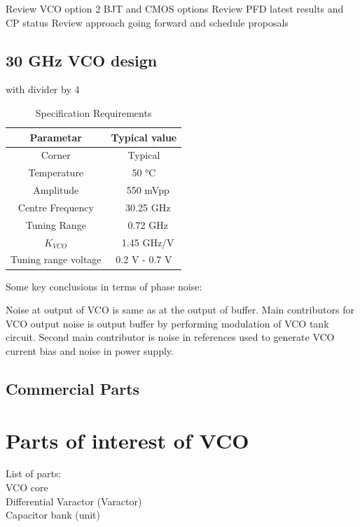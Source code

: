 \documentclass{article}
\begin{document}
Review VCO option 2 BJT and CMOS options
Review PFD latest results and CP status
Review approach going forward and schedule proposals


\subsection{30 GHz VCO design}

with divider by 4

\begin{table}[ht]
	\centering
	\begin{tabular}{|c|c|}
		\hline
		Parametar & Typical value \\
		\hline
		Corner & Typical \\
		\hline
		Temperature & 50 °C \\
		\hline
		Amplitude & ~ 550 mVpp \\
		\hline
		Centre Frequency & ~ 30.25 GHz \\
		\hline
		Tuning Range & ~ 0.72 GHz \\
		\hline
		$K_{VCO}$ & ~ 1.45 GHz/V \\
		\hline
		Tuning range voltage & 0.2 V - 0.7 V \\
		\hline
	\end{tabular}
	\label{30GHz-VCO-design}
	\caption{Specification Requirements} 
\end{table}

Some key conclusions in terms of phase noise:

Noise at output of VCO is same as at the output of buffer. Main contributors for VCO output noise is output buffer by performing modulation of VCO tank circuit. Second main contributor is noise in references used to generate VCO current bias and noise in power supply.

\subsection{Commercial Parts}


\section{Parts of interest of VCO}

List of parts:
\\
VCO core
\\
Differential Varactor (Varactor)
\\
Capacitor bank (unit)
\end{document}

